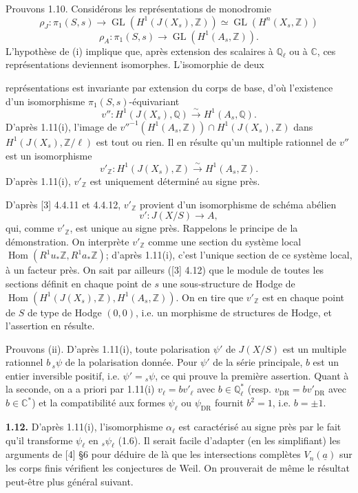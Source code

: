 \documentclass[10pt]{article}
\newcommand{\C}{\mathbb C}
\newcommand{\Q}{\mathbb Q}
\newcommand{\Z}{\mathbb Z}
\newcommand{\DR}{\mathrm{DR}}
\newcommand{\GL}{\operatorname{GL}}
\newcommand{\Hom}{\operatorname{Hom}}
\newcommand{\iso}{\xrightarrow{\sim}}
\newcommand{\sourcebreak}{\clearpage}
\begin{document}
Prouvons 1.10. Considérons les représentations de monodromie
\[
\rho_J:\pi_1(S,s)\longrightarrow\GL(H^1(J(X_s),\Z))\simeq\GL(H^n(X_s,\Z))
\]
\[
\rho_A:\pi_1(S,s)\longrightarrow\GL(H^1(A_s,\Z)).
\]
L'hypothèse de (i) implique que, après extension des scalaires à \(\Q_\ell\) ou à \(\C\), ces représentations deviennent isomorphes. L'isomorphie de deux

\sourcebreak
représentations est invariante par extension du corps de base, d'où l'existence d'un isomorphisme \(\pi_1(S,s)\)-équivariant
\[
v'':H^1(J(X_s),\Q)\iso H^1(A_s,\Q).
\]
D'après 1.11(i), l'image de \(v''^{-1}(H^1(A_s,\Z))\cap H^1(J(X_s),\Z)\) dans \(H^1(J(X_s),\Z/\ell)\) est tout ou rien. Il en résulte qu'un multiple rationnel de \(v''\) est un isomorphisme
\[
v'_\Z:H^1(J(X_s),\Z)\iso H^1(A_s,\Z).
\]
D'après 1.11(i), \(v'_\Z\) est uniquement déterminé au signe près.

D'après [3] 4.4.11 et 4.4.12, \(v'_\Z\) provient d'un isomorphisme de schéma abélien
\[
v':J(X/S)\longrightarrow A,
\]
qui, comme \(v'_\Z\), est unique au signe près. Rappelons le principe de la démonstration. On interprète \(v'_\Z\) comme une section du système local \(\Hom(R^1u_*\Z,R^1a_*\Z)\); d'après 1.11(i), c'est l'unique section de ce système local, à un facteur près. On sait par ailleurs ([3] 4.12) que le module de toutes les sections définit en chaque point de \(s\) une sous-structure de Hodge de \(\Hom(H^1(J(X_s),\Z),H^1(A_s,\Z))\). On en tire que \(v'_\Z\) est en chaque point de \(S\) de type de Hodge \((0,0)\), i.e. un morphisme de structures de Hodge, et l'assertion en résulte.

Prouvons (ii). D'après 1.11(i), toute polarisation \(\psi'\) de \(J(X/S)\) est un multiple rationnel \(b\,{}_s\psi\) de la polarisation donnée. Pour \(\psi'\) de la série principale, \(b\) est un entier inversible positif, i.e. \(\psi'={}_s\psi\), ce qui prouve la première assertion. Quant à la seconde, on a a priori par 1.11(i) \(v_\ell=bv'_\ell\) avec \(b\in\Q_\ell^*\) (resp. \(v_{\DR}=bv'_{\DR}\) avec \(b\in\C^*\)) et la compatibilité aux formes \(\psi_\ell\) ou \(\psi_{\DR}\) fournit \(b^2=1\), i.e. \(b=\pm1\).

\noindent\textbf{1.12.} D'après 1.11(i), l'isomorphisme \(\alpha_\ell\) est caractérisé au signe près par le fait qu'il transforme \(\psi_\ell\) en \({}_s\psi_\ell\) (1.6). Il serait facile d'adapter (en les simplifiant) les arguments de [4] \S6 pour déduire de là que les intersections complètes \(V_n(\underline a)\) sur les corps finis vérifient les conjectures de Weil. On prouverait de même le résultat peut-être plus général suivant.
\end{document}
